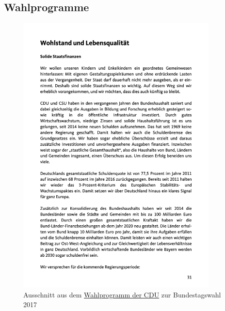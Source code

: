 \subsection*{Wahlprogramme}

\begin{figure}[H]
    \centering
    \includegraphics[width=0.9\textwidth]{data/images/appendix/union_btw17_ausschnitt.png}
    \caption{Ausschnitt aus dem \href{https://archiv.cdu.de/system/tdf/media/dokumente/170703regierungsprogramm2017.pdf?file=1}{Wahlprogramm der CDU} zur Bundestagswahl 2017}
    \label{fig:partyProgramExapleCdu}
\end{figure}


